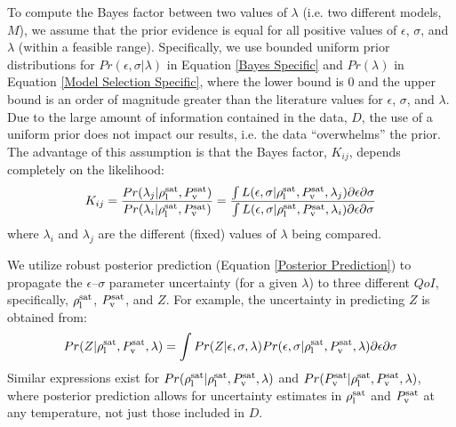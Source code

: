 \documentclass[preprint,letterpaper,floatfix,citeautoscript,aip,jcp]{revtex4-1}
\begin{document}
To compute the Bayes factor between two values of $\lambda$ 
(i.e. two different models, $M$), we assume that the prior evidence is equal for all positive values of $\epsilon$, $\sigma$, and $\lambda$ (within a feasible range). Specifically, we use bounded uniform prior distributions for $Pr(\epsilon,\sigma|\lambda)$ in Equation \ref{Bayes Specific} and $Pr(\lambda)$ in Equation \ref{Model Selection Specific}, where the lower bound is 0 and the upper bound is an order of magnitude greater than the literature values for $\epsilon$, $\sigma$, and $\lambda$. Due to the large amount of information contained in the data, $D$, the use of a uniform prior does not impact our results, i.e. the data ``overwhelms'' the prior.
The advantage of this assumption is that the Bayes factor, $K_{ij}$, depends completely on the likelihood:
\begin{equation} \label{Bayes Factor}
K_{ij} = \frac{Pr(\lambda_j|\rho_{\rm l}^{\rm sat},P_{\rm v}^{\rm sat})}{Pr(\lambda_i|\rho_{\rm l}^{\rm sat},P_{\rm v}^{\rm sat})} = \frac{ \int L(\epsilon,\sigma|\rho_{\rm l}^{\rm sat},P_{\rm v}^{\rm sat},\lambda_j) \partial\epsilon \partial\sigma}{ \int L(\epsilon,\sigma|\rho_{\rm l}^{\rm sat},P_{\rm v}^{\rm sat},\lambda_i) \partial\epsilon \partial\sigma}
\end{equation}
where $\lambda_i$ and $\lambda_j$ are the different (fixed) values of $\lambda$ being compared.

We utilize robust posterior prediction (Equation \ref{Posterior Prediction}) to propagate the $\epsilon$--$\sigma$ parameter uncertainty (for a given $\lambda$) to three different $QoI$, specifically, $\rho_{\rm l}^{\rm sat}$, $P_{\rm v}^{\rm sat}$, and $Z$. For example, the uncertainty in predicting $Z$ 
is obtained from:
\begin{equation} \label{Posterior Prediction Z}
Pr(Z|\rho_{\rm l}^{\rm sat},P_{\rm v}^{\rm sat},\lambda) = \int Pr(Z|\epsilon,\sigma,\lambda) Pr(\epsilon, \sigma|\rho_{\rm l}^{\rm sat},P_{\rm v}^{\rm sat},\lambda) \partial\epsilon \partial\sigma
\end{equation}
Similar expressions exist for $Pr(\rho_{\rm l}^{\rm sat}|\rho_{\rm l}^{\rm sat},P_{\rm v}^{\rm sat},\lambda)$ and $Pr(P_{\rm v}^{\rm sat}|\rho_{\rm l}^{\rm sat},P_{\rm v}^{\rm sat},\lambda)$, where posterior prediction allows for uncertainty estimates in $\rho_{\rm l}^{\rm sat}$ and $P_{\rm v}^{\rm sat}$ at any temperature, not just those included in $D$. 
\end{document}
